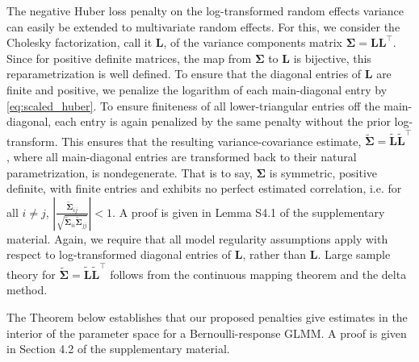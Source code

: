 \documentclass[11pt, a4paper]{article}
\newcommand*{\bb}{\boldsymbol}
\theoremstyle{example} \newtheorem{example}{Example}[section]
\theoremstyle{theorem} \newtheorem{theorem}{Theorem}[section]
\def\bSigma{\bb{\Sigma}}
\def\bL{\bb{L}}
\def\bLt{\tilde{\bb{L}}}
\begin{document}
The negative Huber loss penalty on the log-transformed random effects variance can easily be extended to multivariate random effects. For this, we consider the Cholesky factorization, call it $\bL$, of the variance components matrix $\bSigma = \bL\bL^\top$. Since for positive definite matrices, the map from $\bSigma$ to $\bL$ is bijective, this reparametrization is well defined. To ensure that the diagonal entries of $\bL$ are finite and positive, we penalize the logarithm of each main-diagonal entry by \eqref{eq:scaled_huber}. To ensure finiteness of all lower-triangular entries off the main-diagonal, each entry is again penalized by the same penalty without the prior log-transform. This ensures that the resulting variance-covariance estimate, $\widetilde{\bSigma} = \bLt\bLt^\top$, where all main-diagonal entries are transformed back to their natural parametrization, is nondegenerate. That is to say, $\bSigma$ is symmetric, positive definite, with finite entries and exhibits no perfect estimated correlation, i.e. for all $i \neq j$, $\left|\frac{\widetilde{\bSigma}_{ij} }{\sqrt{ \widetilde{\bSigma}_{ii} \widetilde{\bSigma}_{jj}}}\right|<1$. A proof is given in Lemma S4.1 of the supplementary material. Again, we require that all model regularity assumptions apply with respect to log-transformed diagonal entries of $\bL$, rather than $\bL$. Large sample theory for $\widetilde{\bSigma}=\bLt\bLt^\top$ follows from the continuous mapping theorem and the delta method. 

The Theorem below establishes that our proposed penalties give estimates in the interior of the parameter space for a Bernoulli-response GLMM. A proof is given in Section 4.2 of the supplementary material. 
\end{document}
